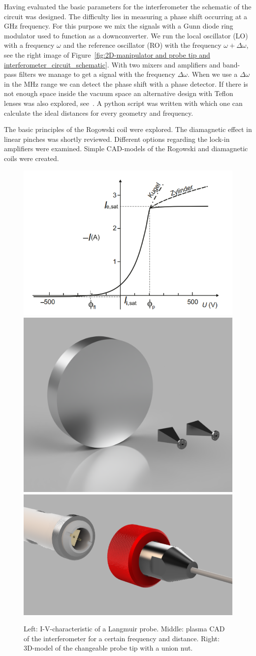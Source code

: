 Having evaluated the basic parameters for the interferometer the schematic of the circuit was designed. The difficulty lies in measuring a phase shift occurring at a GHz frequency. For this purpose we mix the signals with a  Gunn diode ring modulator used to function as a downconverter. We run the local oscillator (LO) with a frequency $\omega$ and the reference oscillator (RO) with the frequency $\omega + \Delta \omega$, see the right image of Figure~\ref{fig:2D-manipulator and probe tip and interferometer_circuit_schematic}. With two mixers and amplifiers and band-pass filters we manage to get a signal with the frequency $\Delta \omega$. When we use a $\Delta \omega$ in the MHz range we can detect the phase shift with a phase detector. If there is not enough space inside the vacuum space an alternative design with Teflon lenses was also explored, see~\cite{2012JInst...7C1107C}. A python script was written with which one can calculate the ideal distances for every geometry and frequency.

The basic principles of the Rogowski coil were explored. The
diamagnetic effect in linear pinches was shortly reviewed.
Different options regarding the lock-in amplifiers were examined.
Simple CAD-models of the Rogowski and diamagnetic coils were created.

\begin{figure}[h]
    \centering
    \includegraphics[width=0.3\linewidth]{Images/04_Diagnostics/probe characteristic.png}
    \includegraphics[width=0.3\linewidth]{Images/04_Diagnostics/CAD_Interferometer.png}
    \includegraphics[width=0.3\linewidth]{Images/04_Diagnostics/CAD_changeable_probe_tip.png}
    \caption{Left: I-V-characteristic of a Langmuir probe\cite{Stroth_Plasmaphysik}. Middle: plasma CAD of the interferometer for a certain frequency and distance. Right: 3D-model of the changeable probe tip with a union nut.}
    \label{fig:probe characteristics and CAD_Interferometer and CAD_changeable_probe_tip}
\end{figure}


